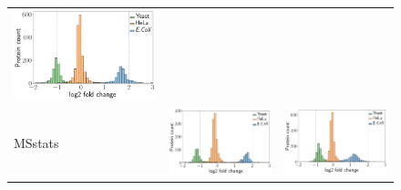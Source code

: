 \documentclass[11pt]{article}
\begin{document}
\begin{figure}[hbt]
\begin{tabular}{>{\centering\arraybackslash} m{3cm} V V}
        \vspace{-1cm}\includegraphics[trim={0 0 0 6}, clip, width=\linewidth]{../../result/report_plots_pipeline/histogram_PS_msqrob2.png} \\ 
        MSstats & \vspace{-1cm}\includegraphics[trim={0 0 0 16}, clip, width=\linewidth]{../../result/report_plots_pipeline/histogram_ID_msstats.png} & 
        \vspace{-1cm}\includegraphics[trim={0 0 0 18}, clip, width=\linewidth]{../../result/report_plots_pipeline/histogram_PS_msstats.png} \\ 

\end{tabular}
\end{figure}
\end{document}
